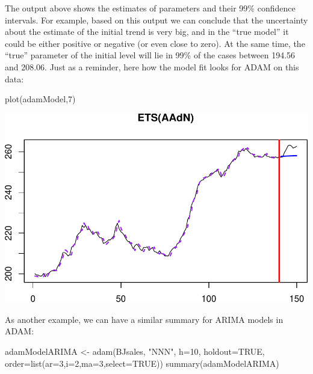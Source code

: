\documentclass[
]{book}
\newenvironment{Shaded}{\begin{snugshade}}{\end{snugshade}}
\newcommand{\AttributeTok}[1]{\textcolor[rgb]{0.77,0.63,0.00}{#1}}
\newcommand{\ConstantTok}[1]{\textcolor[rgb]{0.00,0.00,0.00}{#1}}
\newcommand{\DecValTok}[1]{\textcolor[rgb]{0.00,0.00,0.81}{#1}}
\newcommand{\FunctionTok}[1]{\textcolor[rgb]{0.00,0.00,0.00}{#1}}
\newcommand{\NormalTok}[1]{#1}
\newcommand{\OtherTok}[1]{\textcolor[rgb]{0.56,0.35,0.01}{#1}}
\newcommand{\StringTok}[1]{\textcolor[rgb]{0.31,0.60,0.02}{#1}}
\theoremstyle{definition}
\theoremstyle{definition}
\theoremstyle{definition}
\theoremstyle{definition}
\theoremstyle{remark}
\begin{document}
The output above shows the estimates of parameters and their 99\% confidence intervals. For example, based on this output we can conclude that the uncertainty about the estimate of the initial trend is very big, and in the ``true model'' it could be either positive or negative (or even close to zero). At the same time, the ``true'' parameter of the initial level will lie in 99\% of the cases between 194.56 and 208.06. Just as a reminder, here how the model fit looks for ADAM on this data:

\begin{Shaded}
\begin{Highlighting}[]
\FunctionTok{plot}\NormalTok{(adamModel,}\DecValTok{7}\NormalTok{)}
\end{Highlighting}
\end{Shaded}

\includegraphics{adam_files/figure-latex/unnamed-chunk-187-1.pdf}

As another example, we can have a similar summary for ARIMA models in ADAM:

\begin{Shaded}
\begin{Highlighting}[]
\NormalTok{adamModelARIMA }\OtherTok{\textless{}{-}} \FunctionTok{adam}\NormalTok{(BJsales, }\StringTok{"NNN"}\NormalTok{, }\AttributeTok{h=}\DecValTok{10}\NormalTok{, }\AttributeTok{holdout=}\ConstantTok{TRUE}\NormalTok{,}
                       \AttributeTok{order=}\FunctionTok{list}\NormalTok{(}\AttributeTok{ar=}\DecValTok{3}\NormalTok{,}\AttributeTok{i=}\DecValTok{2}\NormalTok{,}\AttributeTok{ma=}\DecValTok{3}\NormalTok{,}\AttributeTok{select=}\ConstantTok{TRUE}\NormalTok{))}
\FunctionTok{summary}\NormalTok{(adamModelARIMA)}
\end{Highlighting}
\end{Shaded}
\end{document}
